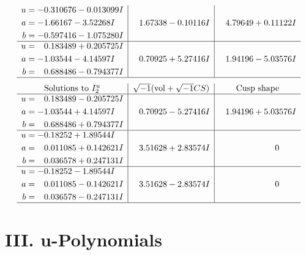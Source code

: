 \documentclass[1p]{elsarticle_modified}
\theoremstyle{definition}
\newcommand{\I}{\sqrt{-1}}
\begin{document}
$$\begin{array}{c|c|c}
\begin{aligned}
u &= -0.310676 - 0.013099 I \\
a &= -1.66167 - 3.52268 I \\
b &= -0.597416 - 1.075280 I\end{aligned}
 & \phantom{-}1.67338 - 0.10116 I & \phantom{-}4.79649 + 0.11122 I \\ \hline\begin{aligned}
u &= \phantom{-}0.183489 + 0.205725 I \\
a &= -1.03544 - 4.14597 I \\
b &= \phantom{-}0.688486 - 0.794377 I\end{aligned}
 & \phantom{-}0.70925 + 5.27416 I & \phantom{-}1.94196 - 5.03576 I\\
 \hline 
 \end{array}$$\newpage$$\begin{array}{c|c|c}  
\text{Solutions to }I^u_{2}& \I (\text{vol} + \sqrt{-1}CS) & \text{Cusp shape}\\
 \hline 
\begin{aligned}
u &= \phantom{-}0.183489 - 0.205725 I \\
a &= -1.03544 + 4.14597 I \\
b &= \phantom{-}0.688486 + 0.794377 I\end{aligned}
 & \phantom{-}0.70925 - 5.27416 I & \phantom{-}1.94196 + 5.03576 I \\ \hline\begin{aligned}
u &= -0.18252 + 1.89544 I \\
a &= \phantom{-}0.011085 + 0.142621 I \\
b &= \phantom{-}0.036578 + 0.247131 I\end{aligned}
 & \phantom{-}3.51628 + 2.83574 I & \phantom{-0.000000 } 0 \\ \hline\begin{aligned}
u &= -0.18252 - 1.89544 I \\
a &= \phantom{-}0.011085 - 0.142621 I \\
b &= \phantom{-}0.036578 - 0.247131 I\end{aligned}
 & \phantom{-}3.51628 - 2.83574 I & \phantom{-0.000000 } 0\\
 \hline 
 \end{array}$$\newpage
\newpage\renewcommand{\arraystretch}{1}
\centering \section*{ III. u-Polynomials}
\end{document}
